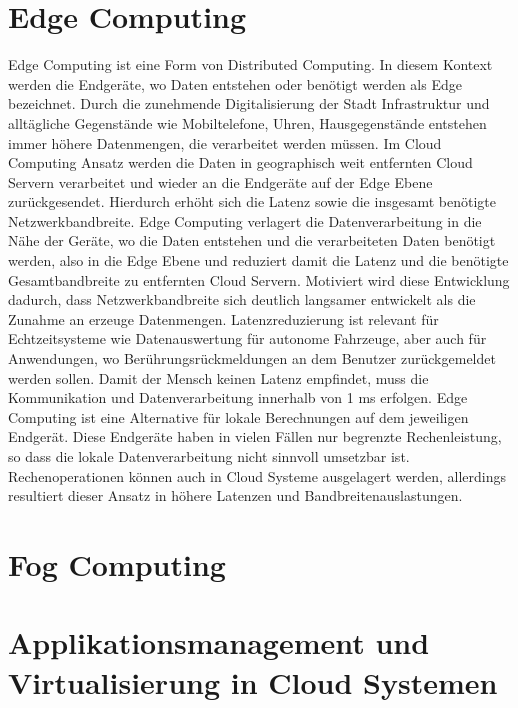 \section{Edge Computing}

Edge Computing ist eine Form von Distributed Computing. In diesem Kontext werden die Endgeräte, wo Daten entstehen oder benötigt werden als Edge bezeichnet. Durch die zunehmende Digitalisierung der Stadt Infrastruktur und alltägliche Gegenstände wie Mobiltelefone, Uhren, Hausgegenstände entstehen immer höhere Datenmengen, die verarbeitet werden müssen. Im Cloud Computing Ansatz werden die Daten in geographisch weit entfernten Cloud Servern verarbeitet und wieder an die Endgeräte auf der Edge Ebene zurückgesendet. Hierdurch erhöht sich die Latenz sowie die insgesamt benötigte Netzwerkbandbreite. Edge Computing verlagert die Datenverarbeitung in die Nähe der Geräte, wo die Daten entstehen und die verarbeiteten Daten benötigt werden, also in die Edge Ebene und reduziert damit die Latenz und die benötigte Gesamtbandbreite zu entfernten Cloud Servern. \cite{Wang2019} Motiviert wird diese Entwicklung dadurch, dass Netzwerkbandbreite sich deutlich langsamer entwickelt als die Zunahme an erzeuge Datenmengen.\cite{Shi2016} Latenzreduzierung ist relevant für Echtzeitsysteme wie Datenauswertung für autonome Fahrzeuge, aber auch für Anwendungen, wo Berührungsrückmeldungen an dem Benutzer zurückgemeldet werden sollen. Damit der Mensch keinen Latenz empfindet, muss die Kommunikation und Datenverarbeitung innerhalb von 1 ms erfolgen. \cite{Varsha2017} Edge Computing ist eine Alternative für lokale Berechnungen auf dem jeweiligen Endgerät. Diese Endgeräte haben in vielen Fällen nur begrenzte Rechenleistung, so dass die lokale Datenverarbeitung nicht sinnvoll umsetzbar ist. Rechenoperationen können auch in Cloud Systeme ausgelagert werden, allerdings resultiert dieser Ansatz in höhere Latenzen und Bandbreitenauslastungen. \cite{Lin2020} 

\section{Fog Computing}



\section{Applikationsmanagement und Virtualisierung in Cloud Systemen}
\label{Applikationsmanagement}

